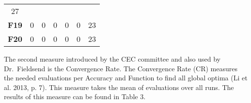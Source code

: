 \documentclass[12pt,a4paper]{article}
\begin{document}
\begin{longtable}[c]{@{}crrrrrr@{}}
\begin{minipage}[t]{0.07\columnwidth}
27
\strut\end{minipage}\tabularnewline
\begin{minipage}[t]{0.11\columnwidth}\centering\strut
\textbf{F19}
\strut\end{minipage} &
\begin{minipage}[t]{0.07\columnwidth}\raggedleft\strut
0
\strut\end{minipage} &
\begin{minipage}[t]{0.08\columnwidth}\raggedleft\strut
0
\strut\end{minipage} &
\begin{minipage}[t]{0.09\columnwidth}\raggedleft\strut
0
\strut\end{minipage} &
\begin{minipage}[t]{0.10\columnwidth}\raggedleft\strut
0
\strut\end{minipage} &
\begin{minipage}[t]{0.11\columnwidth}\raggedleft\strut
0
\strut\end{minipage} &
\begin{minipage}[t]{0.07\columnwidth}\raggedleft\strut
23
\strut\end{minipage}\tabularnewline
\begin{minipage}[t]{0.11\columnwidth}\centering\strut
\textbf{F20}
\strut\end{minipage} &
\begin{minipage}[t]{0.07\columnwidth}\raggedleft\strut
0
\strut\end{minipage} &
\begin{minipage}[t]{0.08\columnwidth}\raggedleft\strut
0
\strut\end{minipage} &
\begin{minipage}[t]{0.09\columnwidth}\raggedleft\strut
0
\strut\end{minipage} &
\begin{minipage}[t]{0.10\columnwidth}\raggedleft\strut
0
\strut\end{minipage} &
\begin{minipage}[t]{0.11\columnwidth}\raggedleft\strut
0
\strut\end{minipage} &
\begin{minipage}[t]{0.07\columnwidth}\raggedleft\strut
23
\strut\end{minipage}\tabularnewline
\bottomrule
\end{longtable}

The second measure introduced by the CEC committee and also used by
Dr.~Fieldsend is the Convergence Rate. The Convergence Rate (CR)
measures the needed evaluations per Accuracy and Function to find all
global optima (Li et al. 2013, p. 7). This measure takes the mean of
evaluations over all runs. The results of this measure can be found in
Table 3.
\end{document}
